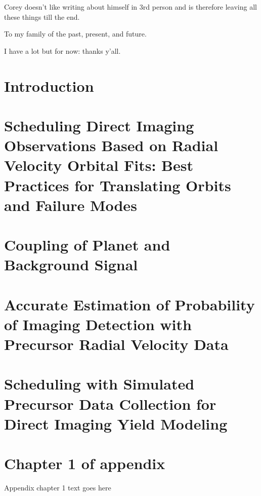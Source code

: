 \documentclass[phd,tocprelim]{cornell}
\begin{document}
\begin{abstract}
\end{abstract}

\begin{biosketch}
Corey doesn't like writing about himself in 3rd person and is therefore leaving
all these things till the end.
\end{biosketch}

\begin{dedication}
To my family of the past, present, and future.
\end{dedication}

\begin{acknowledgements}
I have a lot but for now: thanks y'all.
\end{acknowledgements}

\contentspage
\tablelistpage
\figurelistpage

\normalspacing \setcounter{page}{1} 
\pagestyle{cornell} \addtolength{\parskip}{0.5\baselineskip}

\chapter{Introduction}
\label{cha:intro}


\chapter{Scheduling Direct Imaging Observations Based on Radial Velocity Orbital Fits: Best Practices for Translating Orbits and Failure Modes}
\label{cha:first_paper}


\chapter{Coupling of Planet and Background Signal}
\label{cha:coupling}


\chapter{Accurate Estimation of Probability of Imaging Detection with Precursor Radial Velocity Data}
\label{cha:accurate_pdet}


\chapter{Scheduling with Simulated Precursor Data Collection for Direct Imaging Yield Modeling}
\label{cha:sim_and_scheduling}



\appendix
\chapter{Chapter 1 of appendix}
Appendix chapter 1 text goes here


\end{document}

